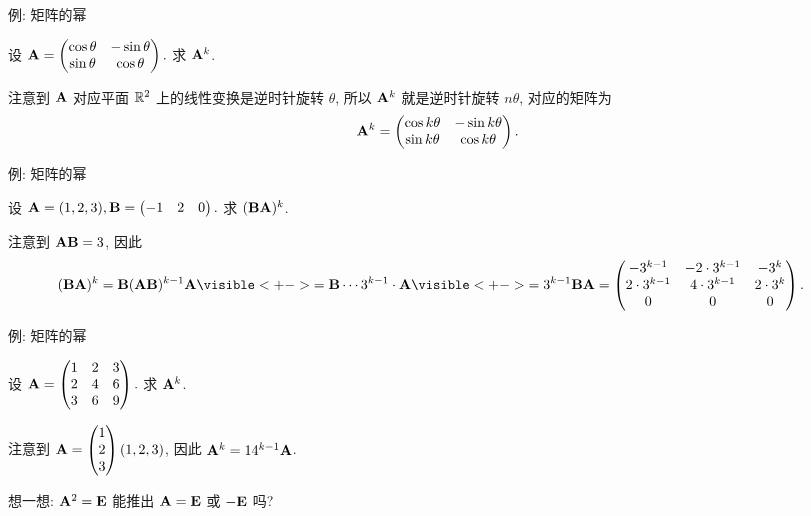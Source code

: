 \begin{frame}{例: 矩阵的幂}
	\onslide<+->
	\begin{example}
		设
		${\mathbf{A}}=\begin{pmatrix}
			\cos\theta&-\sin\theta\\
			\sin\theta&\cos\theta
		\end{pmatrix}.$
		求 ${\mathbf{A}}^k$.
	\end{example}
	\onslide<+->
	\begin{solution}
		注意到 ${\mathbf{A}}$ 对应平面 ${\mathbb{R}}^2$ 上的线性变换是逆时针旋转 $\theta$, 所以 ${\mathbf{A}}^k$ 就是逆时针旋转 $n\theta$, 对应的矩阵为
		\[{\mathbf{A}}^k=\begin{pmatrix}
			\cos k\theta&-\sin k\theta\\
			\sin k\theta&\cos k\theta
		\end{pmatrix}.\]
	\end{solution}
\end{frame}


\begin{frame}{例: 矩阵的幂}
	\onslide<+->
	\begin{example}
		设 
		${\mathbf{A}}=(1,2,3),{\mathbf{B}}=\begin{pmatrix}
			-1&2&0
		\end{pmatrix}.$
		求 $({\mathbf{B}}{\mathbf{A}})^k$.
	\end{example}
	\onslide<+->
	\begin{solution}
		注意到 ${\mathbf{A}}{\mathbf{B}}=3$, 因此
		\begin{align*}
			(\bfB\bfA)^k&=\bfB(\bfA\bfB)^{k-1}\bfA
			\visible<+->{=\bfB\cdots 3^{k-1}\cdot \bfA}
			\visible<+->{=3^{k-1}\bfB\bfA=\begin{pmatrix}
				-3^{k-1}&-2\cdot 3^{k-1}&-3^k\\
				2\cdot 3^{k-1}&4\cdot 3^{k-1}&2\cdot3^{k}\\
				0&0&0
			\end{pmatrix}.}
		\end{align*}
	\end{solution}
\end{frame}


\begin{frame}{例: 矩阵的幂}
	\onslide<+->
	\begin{exercise}
		设 
		${\mathbf{A}}=\begin{pmatrix}
			1&2&3\\
			2&4&6\\
			3&6&9
		\end{pmatrix}.$
		求 ${\mathbf{A}}^k$.
	\end{exercise}
	\onslide<+->
	\begin{answer}
		注意到 ${\mathbf{A}}=\begin{pmatrix}
			1\\2\\3
		\end{pmatrix}(1,2,3)$, 因此 ${\mathbf{A}}^k=14^{k-1}{\mathbf{A}}$.
	\end{answer}
	\onslide<+->
	想一想: ${\mathbf{A}}^2={\mathbf{E}}$ 能推出 ${\mathbf{A}}={\mathbf{E}}$ 或 $-{\mathbf{E}}$ 吗?
\end{frame}


